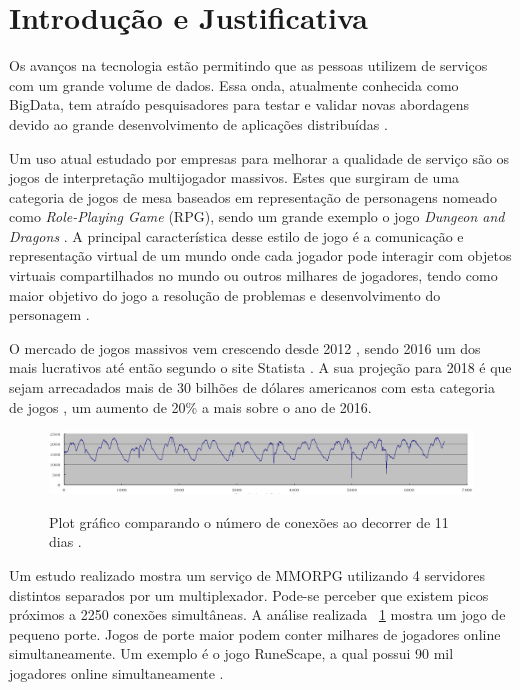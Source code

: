 \section{Introdução e Justificativa}
\label{sec:int}

Os avanços na tecnologia estão permitindo que as pessoas utilizem de serviços com um grande volume de dados. Essa onda, atualmente conhecida como BigData, tem atraído pesquisadores para testar e validar novas abordagens devido ao grande desenvolvimento de aplicações distribuídas \cite{mmo_analytic}.

Um uso atual estudado por empresas para melhorar a qualidade de serviço são os jogos de interpretação multijogador massivos. Estes que surgiram de uma categoria de jogos de mesa baseados em representação de personagens nomeado como \textit{Role-Playing Game} (RPG), sendo um grande exemplo o jogo \textit{Dungeon and Dragons} \cite{tsr1980dungeons}. A principal característica desse estilo de jogo é a comunicação e representação virtual de um mundo onde cada jogador pode interagir com objetos virtuais compartilhados no mundo ou outros milhares de jogadores, tendo como maior objetivo do jogo a resolução de problemas e desenvolvimento do personagem \cite{video_game_technologies}.

O mercado de jogos massivos vem crescendo desde 2012 \cite{new_york_times}, sendo 2016 um dos mais lucrativos até então segundo o site Statista \cite{statista_2016}. A sua projeção para 2018 é que sejam arrecadados mais de 30 bilhões de dólares americanos com esta categoria de jogos \cite{statista_2018}, um aumento de 20\% a mais sobre o ano de 2016.

\begin{figure}[h]
\caption{Plot gráfico comparando o número de conexões ao decorrer de 11 dias
\cite{system_performance}.}
\centering
\includegraphics[width=1\textwidth]{img/connection_peer_hour.png}
\label{fig:conection_peer_hour}
\end{figure}

Um estudo realizado \cite{system_performance} mostra um serviço de MMORPG utilizando 4 servidores distintos separados por um multiplexador. Pode-se perceber que existem picos próximos a 2250 conexões simultâneas. A análise realizada ~\ref{fig:conection_peer_hour} mostra um jogo de pequeno porte. Jogos de porte maior podem conter milhares de jogadores online simultaneamente. Um exemplo é o jogo RuneScape, a qual possui 90 mil jogadores online simultaneamente \cite{runescape_online_users}.

